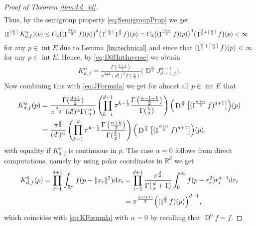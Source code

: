 \documentclass[11pt,a4paper]{article}
\theoremstyle{plain}
\theoremstyle{definition}
\theoremstyle{remark}
\def\RR{\mathbb{R}}
\newcommand{\dd}{{\rm d}}
\newcommand{\frI}{\mathop{\mathrm{I}}\nolimits}
\newcommand{\frD}{\mathop{\mathrm{D}}\nolimits}
\newcommand{\inter}{\operatorname{int}}
\begin{document}
\begin{proof}[Proof of Theorem \ref{thm:kd_jd}]
\begin{align*}
    \end{align*}
    Thus, by the semigroup property \eqref{eq:SemigroupProp} we get 
    \begin{align*}
       (\frI^{\lceil{\alpha\over 2}\rceil}K_{d,f}^{\alpha})(p)& \leq C_2\big((\frI^{{d+\alpha\over 2}}f)(p)\big)^d \big(\frI^{\lceil{\alpha\over 2}\rceil}\frI^{{d\over 2}}f\big)(p)=C_2\big((\frI^{{d+\alpha\over 2}}f)(p)\big)^d \big(\frI^{{d\over 2}+\lceil{\alpha\over 2}\rceil}f\big)(p)<\infty
    \end{align*}
    for any $p\in \inter E$ due to Lemma \ref{lm:technical} and since that $(\frI^{{d\over 2}+\lceil{\alpha\over 2}\rceil}f)(p)<\infty$ for any $p\in \inter E$. Hence, by \eqref{eq:DiffIntInverse} we obtain 
    \begin{align*}
        K_{d,f}^{\alpha} = \frac{\Gamma(\frac{d+1}{2})}{\pi^{\frac{d+1}{2}}(d!)^\alpha\Gamma(\frac{\alpha}{2})} \big(\frD^{\frac{\alpha}{2}}J_{d+1,f}^{\alpha-1}\big).
    \end{align*} 
    Now combining this with \eqref{eq:JFormula} we get for almost all $p\in\inter E$ that
    \begin{align*}
        K_{d,f}^{\alpha}(p)&=\frac{\Gamma(\frac{d+1}{2})}{\pi^{\frac{d+1}{2}}(d!)^\alpha\Gamma(\frac{\alpha}{2})} \left(\prod_{k=1}^{d+1}\pi^{k-{1\over 2}}\frac{\Gamma\left(\frac{\alpha-1+k}{2}\right)}{\Gamma(\frac{k}{2})}\right)\Big(\frD^{\frac{\alpha}{2}}\big[(\frI^{\frac{d+\alpha}{2}}f)^{d+1}\big]\Big)(p)\\
        &=\frac{\pi^{\frac{d}{2}}}{(d!)^\alpha} \left(\prod_{k=1}^{d}\pi^{k-{1\over 2}}\frac{\Gamma\left(\frac{\alpha+k}{2}\right)}{\Gamma(\frac{k}{2})}\right)\Big(\frD^{\frac{\alpha}{2}}\big[(\frI^{\frac{d+\alpha}{2}}f)^{d+1}\big]\Big)(p),
    \end{align*}
    with equality if $K_{d,f}^{\alpha}$ is continuous in $p$.
    The case $\alpha=0$ follows from direct computations, namely by using polar coordinates in $\RR^d$ we get
    \begin{align*}
        K_{d,f}^0(p)=\prod_{i=1}^{d+1}\int_{\RR^d} f(p-\|x_i\|^2)\dd x_i&=\prod_{i=1}^{d+1}{\pi^{d\over 2}\over \Gamma({d\over 2}+1)}\int_{0}^{\infty}f(p-r_i^2)r_i^{d-1}\dd r_i\\&=\pi^{d(d+1)\over 2}\Big((\frI^{d\over 2}f)(p)\Big)^{d+1},
    \end{align*}
    which coincides with \eqref{eq:KFormula} with $\alpha=0$ by recalling that $\frD^0f=f$.
\end{proof}
\end{document}
